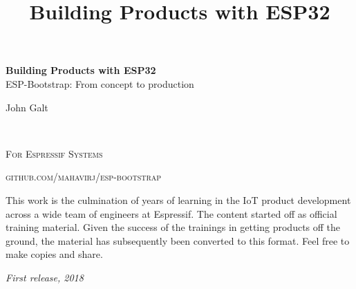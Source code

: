 \documentclass[11pt,fleqn]{book} %
\begin{document}
\title{Building Products with ESP32}


\begingroup
\thispagestyle{empty}
\centering
\vspace*{5cm}
\par\normalfont\fontsize{35}{35}\sffamily\selectfont
\textbf{Building Products with ESP32}\\
{\LARGE ESP-Bootstrap: From concept to production}\par %
\vspace*{1cm}
{\Huge John Galt}\par %
\endgroup


\newpage
~\vfill
\thispagestyle{empty}


\noindent \textsc{For Espressif Systems}

\noindent \textsc{github.com/mahavirj/esp-bootstrap} %

\noindent This work is the culmination of years of learning in the IoT product development across a wide team of engineers at Espressif. The content started off as official training material. Given the success of the trainings in getting products off the ground, the material has subsequently been converted to this format. Feel free to make copies and share. %

\noindent \textit{First release, 2018} %



\pagestyle{empty} %

\tableofcontents %
\end{document}
